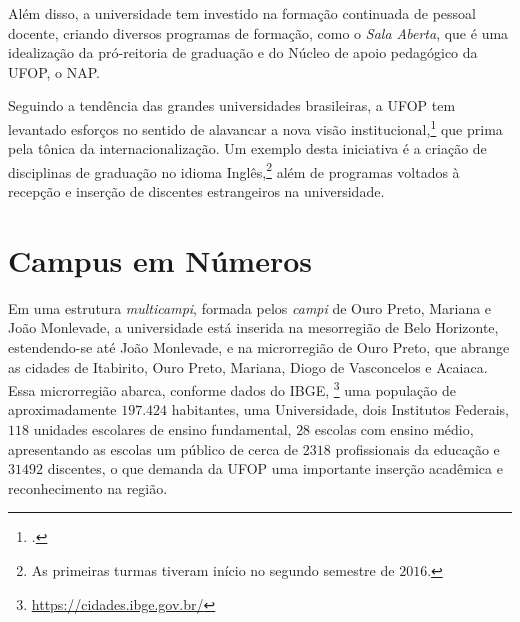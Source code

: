 \documentclass[
	12pt,				%
	openright,			%
	oneside,			%
	a4paper,			%
	english,			%
	brazil				%
	]{abntex2}
\begin{document}
Além disso, a universidade tem investido na formação continuada de pessoal docente, criando diversos programas de formação, como o \textit{Sala Aberta}, que é uma idealização da pró-reitoria de graduação e do Núcleo de apoio pedagógico da UFOP, o NAP.

Seguindo a tendência das grandes universidades brasileiras, a UFOP tem levantado esforços no sentido de alavancar a nova visão institucional,\footcite{PDI-UFOP} que prima pela tônica da internacionalização. Um exemplo desta iniciativa é a criação de disciplinas de graduação no idioma Inglês,\footnote{As primeiras turmas tiveram início no segundo semestre de $2016$.} além de programas voltados à recepção e inserção de discentes estrangeiros na universidade. %
%
%

\section{Campus em Números}
%
Em uma estrutura \textit{multicampi}, formada pelos \textit{campi} de Ouro Preto, Mariana e João Monlevade, a universidade está inserida na mesorregião de Belo Horizonte, estendendo-se até João Monlevade, e na microrregião de Ouro Preto, que abrange as cidades de Itabirito, Ouro Preto, Mariana, Diogo de Vasconcelos e Acaiaca. Essa microrregião abarca, conforme dados do IBGE, \footnote{\url{https://cidades.ibge.gov.br/}} uma população de aproximadamente $197.424$ habitantes, uma Universidade, dois Institutos Federais, $118$ unidades escolares de ensino fundamental, $28$ escolas com ensino médio, apresentando as escolas um público de cerca de $2318$ profissionais da educação e $31492$ discentes, o que demanda da UFOP uma importante inserção acadêmica e reconhecimento na região.
\end{document}
